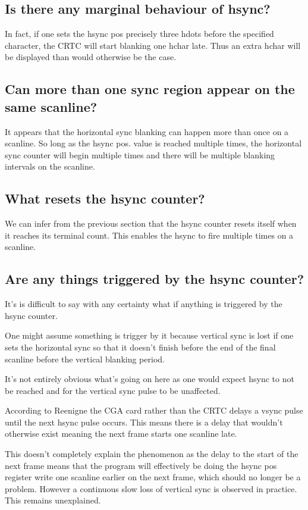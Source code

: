 \documentclass[a4paper,10pt]{amsart}
\begin{document}
\subsection{Is there any marginal behaviour of hsync?}

In fact, if one sets the hsync pos precisely three hdots before the specified
character, the CRTC will start blanking one hchar late. Thus an extra hchar
will be displayed than would otherwise be the case.

\subsection{Can more than one sync region appear on the same scanline?}

It appears that the horizontal sync blanking can happen more than once on a
scanline. So long as the hsync pos. value is reached multiple times, the
horizontal sync counter will begin multiple times and there will be multiple
blanking intervals on the scanline.

\subsection{What resets the hsync counter?}

We can infer from the previous section that the hsync counter resets itself
when it reaches its terminal count. This enables the hsync to fire multiple
times on a scanline.

\subsection{Are any things triggered by the hsync counter?}

It's is difficult to say with any certainty what if anything is triggered by
the hsync counter.

One might assume something is trigger by it because vertical sync is lost
if one sets the horizontal sync so that it doesn't finish before the end of
the final scanline before the vertical blanking period.

It's not entirely obvious what's going on here as one would expect hsync to
not be reached and for the vertical sync pulse to be unaffected.

According to Reenigne the CGA card rather than the CRTC delays a vsync pulse
until the next hsync pulse occurs. This means there is a delay that wouldn't
otherwise exist meaning the next frame starts one scanline late.

This doesn't completely explain the phenomenon as the delay to the start of
the next frame means that the program will effectively be doing the hsync pos
register write one scanline earlier on the next frame, which should no longer
be a problem. However a continuous slow loss of vertical sync is observed in
practice. This remains unexplained.
\end{document}
